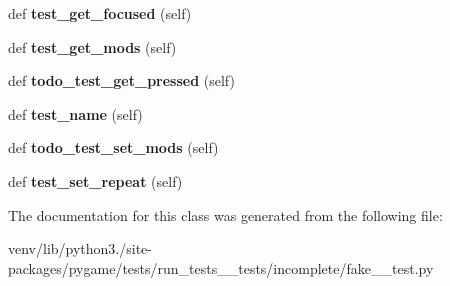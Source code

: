 \begin{DoxyCompactItemize}
\item 
\mbox{\label{classpygame_1_1tests_1_1run__tests____tests_1_1incomplete_1_1fake__2__test_1_1_key_module_test_ac6bb06568464345200e4d6bf8154f1db}} 
def {\bfseries test\+\_\+get\+\_\+focused} (self)
\item 
\mbox{\label{classpygame_1_1tests_1_1run__tests____tests_1_1incomplete_1_1fake__2__test_1_1_key_module_test_aed72c10d0b0d469085a3fbf3ab955a3a}} 
def {\bfseries test\+\_\+get\+\_\+mods} (self)
\item 
\mbox{\label{classpygame_1_1tests_1_1run__tests____tests_1_1incomplete_1_1fake__2__test_1_1_key_module_test_ad9575b5634e3ec68dcc3297f6b30b078}} 
def {\bfseries todo\+\_\+test\+\_\+get\+\_\+pressed} (self)
\item 
\mbox{\label{classpygame_1_1tests_1_1run__tests____tests_1_1incomplete_1_1fake__2__test_1_1_key_module_test_a3b7bc03bf2c968c785cc7a6602b24908}} 
def {\bfseries test\+\_\+name} (self)
\item 
\mbox{\label{classpygame_1_1tests_1_1run__tests____tests_1_1incomplete_1_1fake__2__test_1_1_key_module_test_ac7d73e5f7840ae22a6f89a975dad285d}} 
def {\bfseries todo\+\_\+test\+\_\+set\+\_\+mods} (self)
\item 
\mbox{\label{classpygame_1_1tests_1_1run__tests____tests_1_1incomplete_1_1fake__2__test_1_1_key_module_test_ad43d7f783b5f837666be1ff504b6d8fe}} 
def {\bfseries test\+\_\+set\+\_\+repeat} (self)
\end{DoxyCompactItemize}


The documentation for this class was generated from the following file\+:\begin{DoxyCompactItemize}
\item 
venv/lib/python3./site-\/packages/pygame/tests/run\+\_\+tests\+\_\+\+\_\+tests/incomplete/fake\+\_\+\_\+test.\+py\end{DoxyCompactItemize}

